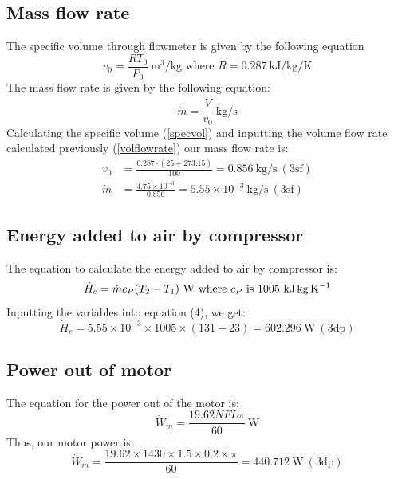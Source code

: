 \documentclass[class=article, crop=false, 12pt,a4paper]{standalone}
\numberwithin{equation}{section}
\begin{document}
\subsection{Mass flow rate}
The specific volume through flowmeter is given by the following equation
\begin{equation}
  v_0 = \frac{RT_0}{P_0} \ \si{\meter\cubed\per\kg} \textrm{ where \(R = 0.287 \ \si{\kilo\joule\per\kg\per\kelvin}\)}
  \label{specvol}
\end{equation}
The mass flow rate is given by the following equation:
\begin{equation}
  \dot{m} = \frac{\dot{V}}{v_0} \ \si{\kg\per\second}
  \label{massflowrate}
\end{equation}
Calculating the specific volume (\ref{specvol}) and inputting the volume flow rate calculated previously (\ref{volflowrate}) our mass flow rate is:
\begin{align} 
  v_0 &= \frac{0.287 \cdot (25+273.15)}{100} = 0.856 \ \si{\kg\per\second} \ (3\textrm{sf})  \\
  \dot{m} &= \frac{4.75 \times 10^{-3}}{0.856} = 5.55 \times 10^{-3} \ \si{\kg\per\second} \ (3\textrm{sf}) 
\end{align}
\subsection{Energy added to air by compressor}
The equation to calculate the energy added to air by compressor is:
\begin{equation}
  \dot{H}_c = \dot{m}c_P(T_2-T_1) \ \si{\watt} \textrm{ where \(c_P\) is 1005 \si{\kilo\joule\kg\per\kelvin}}
  \label{energyaddaircompressor}
\end{equation}
Inputting the variables into equation (4), we get: 
\begin{equation} 
  \dot{H}_c = 5.55 \times 10^{-3} \times 1005 \times (131-23) = 602.296 \ \si{\watt} \ (3\textrm{dp}) 
\end{equation}
\subsection{Power out of motor}
The equation for the power out of the motor is:
\begin{equation}
  \dot{W}_{m} = \frac{19.62NFL\pi}{60} \ \si{\watt}
  \label{motorpower}
\end{equation}
Thus, our motor power is:
\begin{equation} 
  \dot{W}_{m} = \frac{19.62 \times 1430 \times 1.5 \times 0.2 \times \pi}{60} = 440.712 \ \si{\watt} \ (3\textrm{dp})
\end{equation}
\end{document}
